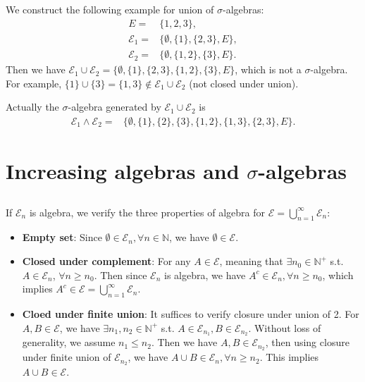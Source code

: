 \documentclass[11pt,a4paper]{article}
\numberwithin{equation}{section}%
\begin{document}
\subsection{}

We construct the following example for union of $ \sigma $-algebras:
\begin{align*}
    E=&\{1,2,3\},\\
    \mathcal{E}_1=&\{\emptyset, \{1\}, \{2,3\}, E\},\\
    \mathcal{E}_2=&\{\emptyset, \{1,2\}, \{3\}, E\}.
\end{align*}
Then we have $ \mathcal{E}_1\cup \mathcal{E}_2=\{\emptyset, \{1\}, \{2,3\}, \{1,2\}, \{3\}, E\} $, which is not a $ \sigma $-algebra. For example, $ \{1\}\cup \{3\}=\{1,3\}\notin \mathcal{E}_1\cup \mathcal{E}_2 $ (not closed under union).

Actually the $ \sigma  $-algebra generated by $ \mathcal{E}_1\cup \mathcal{E}_2 $ is 
\begin{align*}
    \mathcal{E}_1\wedge \mathcal{E}_2=&\{\emptyset, \{1\}, \{2\}, \{3\}, \{1,2\}, \{1,3\}, \{2,3\}, E\}.
\end{align*}

\section{Increasing algebras and $ \sigma  $-algebras}

\subsection{}

If $ \mathcal{E}_n $ is algebra, we verify the three properties of algebra for $ \mathcal{E}=\bigcup_{n=1}^\infty \mathcal{E}_n $:
\begin{itemize}[topsep=2pt,itemsep=0pt]
    \item \textbf{Empty set}: Since $ \emptyset\in \mathcal{E}_n, \forall n\in \mathbb{N} $, we have $ \emptyset\in \mathcal{E} $.
    \item \textbf{Closed under complement}: For any $ A\in \mathcal{E} $, meaning that $ \exists n_0\in \mathbb{N}^+ $ s.t. $ A\in \mathcal{E}_n $, $ \forall n\geq n_0 $. Then since $ \mathcal{E}_n $ is algebra, we have $ A^c\in \mathcal{E}_n, \forall n\geq n_0 $, which implies $ A^c\in \mathcal{E} = \bigcup_{n=1}^\infty \mathcal{E}_n $.
    \item \textbf{Cloed under finite union}: It suffices to verify closure under union of 2. For $ A,B\in \mathcal{E} $, we have $ \exists n_1,n_2\in \mathbb{N}^+ $ s.t. $ A\in \mathcal{E}_{n_1}, B\in \mathcal{E}_{n_2} $. Without loss of generality, we assume $ n_1\leq n_2 $. Then we have $ A,B\in \mathcal{E}_{n_2} $, then using closure under finite union of $ \mathcal{E}_{n_2} $, we have $ A\cup B\in \mathcal{E}_{n}, \forall n\geq n_2 $. This implies $ A\cup B\in \mathcal{E} $.
\end{itemize}
\end{document}
